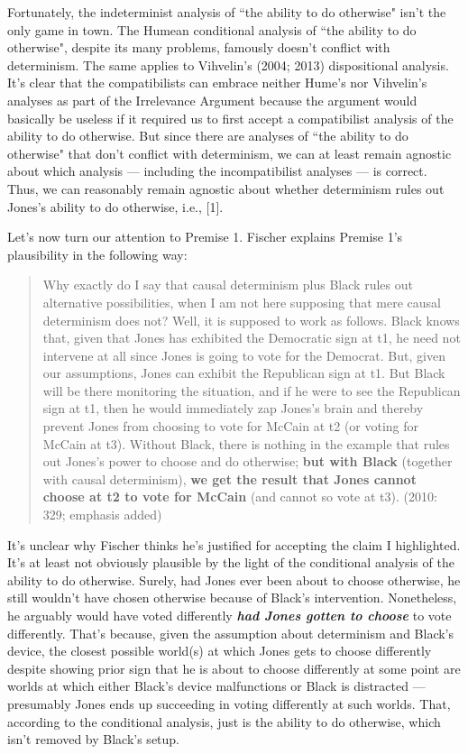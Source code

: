 \documentclass[a4paper,12pt]{article}
\begin{document}
Fortunately, the indeterminist analysis of ``the ability to do otherwise" isn't the only game in town. The Humean conditional analysis of ``the ability to do otherwise", despite its many problems, famously doesn't conflict with determinism. The same applies to Vihvelin's (2004; 2013) dispositional analysis. It's clear that the compatibilists can embrace neither Hume's nor Vihvelin's analyses as part of the Irrelevance Argument because the argument would basically be useless if it required us to first accept a compatibilist analysis of the ability to do otherwise. But since there are analyses of ``the ability to do otherwise" that don't conflict with determinism, we can at least remain agnostic about which analysis --- including the incompatibilist analyses --- is correct. Thus, we can reasonably remain agnostic about whether determinism rules out Jones's ability to do otherwise, i.e., [1].

Let's now turn our attention to Premise 1. Fischer explains Premise 1's plausibility in the following way:

\begin{quote}
Why exactly do I say that causal determinism plus Black rules out alternative possibilities, when I am not here supposing that mere causal determinism does not? Well, it is supposed to work as follows. Black knows that, given that Jones has exhibited the Democratic sign at t1, he need not intervene at all since Jones is going to vote for the Democrat. But, given our assumptions, Jones can exhibit the Republican sign at t1. But Black will be there monitoring the situation, and if he were to see the Republican sign at t1, then he would immediately zap Jones's brain and thereby prevent Jones from choosing to vote for McCain at t2 (or voting for McCain at t3). Without Black, there is nothing in the example that rules out Jones's power to choose and do otherwise; \textbf{but with Black} (together with causal determinism), \textbf{we get the result that Jones cannot choose at t2 to vote for McCain} (and cannot so vote at t3). (2010: 329; emphasis added)
\end{quote}

It's unclear why Fischer thinks he's justified for accepting the claim I highlighted. It's at least not obviously plausible by the light of the conditional analysis of the ability to do otherwise. Surely, had Jones ever been about to choose otherwise, he still wouldn't have chosen otherwise because of Black's intervention. Nonetheless, he arguably would have voted differently \textbf{\emph{had Jones gotten to choose}} to vote differently. That's because, given the assumption about determinism and Black's device, the closest possible world(s) at which Jones gets to choose differently despite showing prior sign that he is about to choose differently at some point are worlds at which either Black's device malfunctions or Black is distracted --- presumably Jones ends up succeeding in voting differently at such worlds. That, according to the conditional analysis, just is the ability to do otherwise, which isn't removed by Black's setup.
\end{document}
